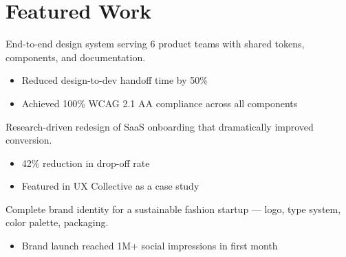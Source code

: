 
\section{Featured Work}



End-to-end design system serving 6 product teams with shared tokens, components, and documentation.


\begin{itemize}

  \item Reduced design-to-dev handoff time by 50\%

  \item Achieved 100\% WCAG 2.1 AA compliance across all components

\end{itemize}




Research-driven redesign of SaaS onboarding that dramatically improved conversion.


\begin{itemize}

  \item 42\% reduction in drop-off rate

  \item Featured in UX Collective as a case study

\end{itemize}




Complete brand identity for a sustainable fashion startup — logo, type system, color palette, packaging.


\begin{itemize}

  \item Brand launch reached 1M+ social impressions in first month

\end{itemize}



